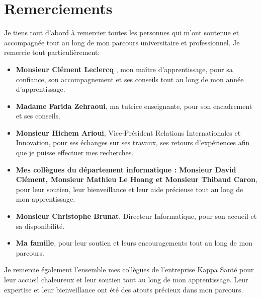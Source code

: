 \section{Remerciements}
Je tiens tout d'abord à remercier toutes les personnes qui m'ont soutenue et accompagnée tout au long de mon parcours universitaire et professionnel. 
Je remercie tout particulièrement: \
\begin{itemize}
    \item \textbf{Monsieur Clément Leclercq }, mon maître d'apprentissage, pour sa confiance, son accompagnement et ses conseils tout au long de mon année d'apprentissage.
    \item \textbf{Madame Farida Zehraoui}, ma tutrice enseignante, pour son encadrement et ses conseils.
    \item \textbf{Monsieur Hichem Arioui}, Vice-Président Relations Internationales et Innovation, pour ses échanges sur ses travaux, ses retours d'expériences afin que je puisse effectuer mes recherches.
    \item \textbf{Mes collègues du département informatique : Monsieur David Clément, Monsieur Mathieu Le Hoang et Monsieur Thibaud Caron}, pour leur soutien, leur bienveillance et leur aide précieuse tout au long de mon apprentissage.
    \item \textbf{Monsieur Christophe Brunat}, Directeur Informatique, pour son accueil et sa disponibilité.
    \item \textbf{Ma famille}, pour leur soutien et leurs encouragements tout au long de mon parcours.
\end{itemize}
Je remercie également l'ensemble mes collègues de l'entreprise Kappa Santé pour leur accueil chaleureux et leur soutien tout au long de mon apprentissage. Leur expertise et leur bienveillance ont été des atouts précieux dans mon parcours.